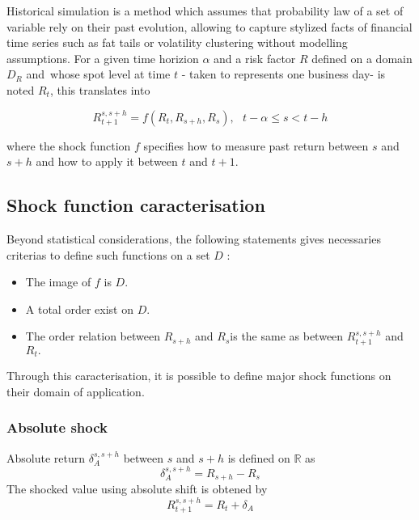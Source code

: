 \documentclass[10pt,a4paper]{report}
\begin{document}
Historical simulation is a method which assumes that probability law of a
set of variable rely on their past evolution, allowing to capture stylized
facts of financial time series such as fat tails or volatility clustering
without modelling assumptions. For a given time horizion $\alpha $ and a
risk factor $R$ defined on a domain $D_{R}$ and\ whose spot level at time $t$
- taken to represents one business day- is noted $R_{t}$, this translates
into

\begin{equation*}
R_{t+1}^{s,s+h}=f(R_{t},R_{s+h},R_{s}),\text{ \ \ }t-\alpha \leq s<t-h
\end{equation*}

where the shock function $f$ specifies how to measure past return between $s$
and $s+h$ and how to apply it between $t$ and $t+1$.


\subsection{Shock function caracterisation}
Beyond statistical
considerations, the following statements gives necessaries criterias to
define such functions on a set $D$ :

\bigskip

\begin{itemize}
\item The image of $f$ is $D.$

\item A total order exist on $D.$

\item The order relation between $R_{s+h}$ and $R_{s}$is the same as between 
$R_{t+1}^{s,s+h}$ and $R_{t}.$
\end{itemize}

\bigskip 

Through this caracterisation, it is possible to define major shock functions
on their domain of application.

\subsubsection{Absolute shock}

Absolute return $\delta _{A}^{s,s+h}$ between $s$ and $s+h$ is defined on $%
\mathbb{R}$ as%
\begin{equation*}
\delta _{A}^{s,s+h}=R_{s+h}-R_{s}
\end{equation*}%
The shocked value using absolute shift is obtened by 
\begin{equation*}
R_{t+1}^{s,s+h}=R_{t}+\delta _{A}
\end{equation*}
\end{document}
